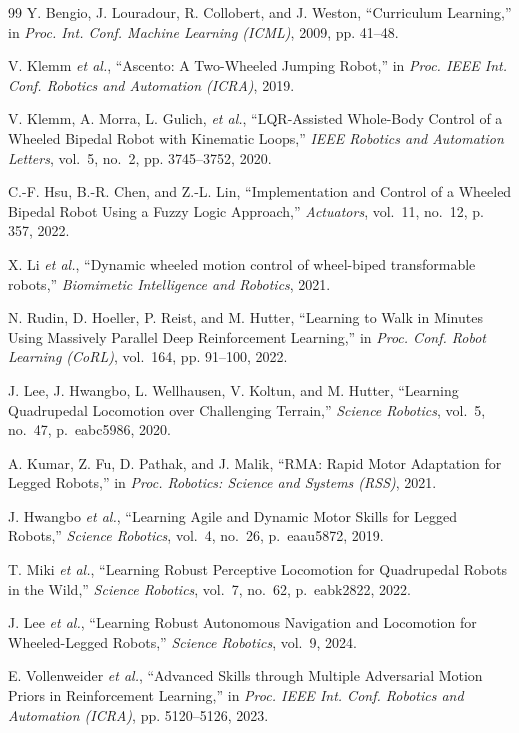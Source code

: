 \documentclass[conference]{IEEEtran}
\begin{document}
\begin{thebibliography}{99}
Y. Bengio, J. Louradour, R. Collobert, and J. Weston,
``Curriculum Learning,''
in \emph{Proc. Int. Conf. Machine Learning (ICML)}, 2009, pp. 41--48.

V. Klemm \emph{et al.},
``Ascento: A Two-Wheeled Jumping Robot,''
in \emph{Proc. IEEE Int. Conf. Robotics and Automation (ICRA)}, 2019.

V. Klemm, A. Morra, L. Gulich, \emph{et al.},
``LQR-Assisted Whole-Body Control of a Wheeled Bipedal Robot
with Kinematic Loops,''
\emph{IEEE Robotics and Automation Letters},
vol.~5, no.~2, pp. 3745--3752, 2020.

C.-F. Hsu, B.-R. Chen, and Z.-L. Lin,
``Implementation and Control of a Wheeled Bipedal Robot Using
a Fuzzy Logic Approach,''
\emph{Actuators}, vol.~11, no.~12, p. 357, 2022.

X. Li \emph{et al.},
``Dynamic wheeled motion control of wheel-biped transformable robots,''
\emph{Biomimetic Intelligence and Robotics}, 2021.

N. Rudin, D. Hoeller, P. Reist, and M. Hutter,
``Learning to Walk in Minutes Using Massively Parallel Deep Reinforcement Learning,''
in \emph{Proc. Conf. Robot Learning (CoRL)}, vol.~164, pp. 91--100, 2022.

J. Lee, J. Hwangbo, L. Wellhausen, V. Koltun, and M. Hutter,
``Learning Quadrupedal Locomotion over Challenging Terrain,''
\emph{Science Robotics}, vol.~5, no.~47, p.~eabc5986, 2020.

A. Kumar, Z. Fu, D. Pathak, and J. Malik,
``RMA: Rapid Motor Adaptation for Legged Robots,''
in \emph{Proc. Robotics: Science and Systems (RSS)}, 2021.

J. Hwangbo \emph{et al.},
``Learning Agile and Dynamic Motor Skills for Legged Robots,''
\emph{Science Robotics}, vol.~4, no.~26, p.~eaau5872, 2019.

T. Miki \emph{et al.},
``Learning Robust Perceptive Locomotion for Quadrupedal Robots in the Wild,''
\emph{Science Robotics}, vol.~7, no.~62, p.~eabk2822, 2022.

J. Lee \emph{et al.},
``Learning Robust Autonomous Navigation and Locomotion for Wheeled-Legged Robots,''
\emph{Science Robotics}, vol.~9, 2024.

E. Vollenweider \emph{et al.},
``Advanced Skills through Multiple Adversarial Motion Priors in Reinforcement Learning,''
in \emph{Proc. IEEE Int. Conf. Robotics and Automation (ICRA)}, pp. 5120--5126, 2023.


\end{thebibliography}
\end{document}
